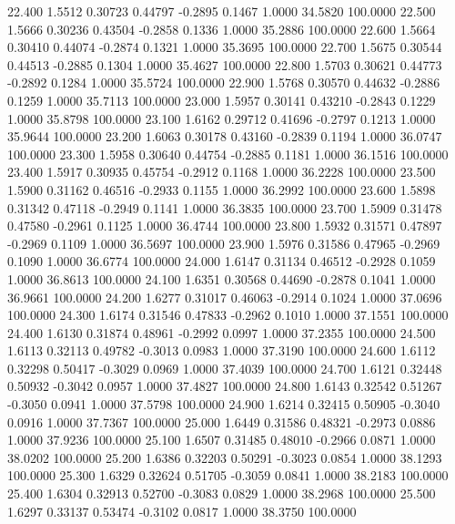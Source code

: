   22.400   1.5512   0.30723   0.44797  -0.2895   0.1467   1.0000  34.5820 100.0000
  22.500   1.5666   0.30236   0.43504  -0.2858   0.1336   1.0000  35.2886 100.0000
  22.600   1.5664   0.30410   0.44074  -0.2874   0.1321   1.0000  35.3695 100.0000
  22.700   1.5675   0.30544   0.44513  -0.2885   0.1304   1.0000  35.4627 100.0000
  22.800   1.5703   0.30621   0.44773  -0.2892   0.1284   1.0000  35.5724 100.0000
  22.900   1.5768   0.30570   0.44632  -0.2886   0.1259   1.0000  35.7113 100.0000
  23.000   1.5957   0.30141   0.43210  -0.2843   0.1229   1.0000  35.8798 100.0000
  23.100   1.6162   0.29712   0.41696  -0.2797   0.1213   1.0000  35.9644 100.0000
  23.200   1.6063   0.30178   0.43160  -0.2839   0.1194   1.0000  36.0747 100.0000
  23.300   1.5958   0.30640   0.44754  -0.2885   0.1181   1.0000  36.1516 100.0000
  23.400   1.5917   0.30935   0.45754  -0.2912   0.1168   1.0000  36.2228 100.0000
  23.500   1.5900   0.31162   0.46516  -0.2933   0.1155   1.0000  36.2992 100.0000
  23.600   1.5898   0.31342   0.47118  -0.2949   0.1141   1.0000  36.3835 100.0000
  23.700   1.5909   0.31478   0.47580  -0.2961   0.1125   1.0000  36.4744 100.0000
  23.800   1.5932   0.31571   0.47897  -0.2969   0.1109   1.0000  36.5697 100.0000
  23.900   1.5976   0.31586   0.47965  -0.2969   0.1090   1.0000  36.6774 100.0000
  24.000   1.6147   0.31134   0.46512  -0.2928   0.1059   1.0000  36.8613 100.0000
  24.100   1.6351   0.30568   0.44690  -0.2878   0.1041   1.0000  36.9661 100.0000
  24.200   1.6277   0.31017   0.46063  -0.2914   0.1024   1.0000  37.0696 100.0000
  24.300   1.6174   0.31546   0.47833  -0.2962   0.1010   1.0000  37.1551 100.0000
  24.400   1.6130   0.31874   0.48961  -0.2992   0.0997   1.0000  37.2355 100.0000
  24.500   1.6113   0.32113   0.49782  -0.3013   0.0983   1.0000  37.3190 100.0000
  24.600   1.6112   0.32298   0.50417  -0.3029   0.0969   1.0000  37.4039 100.0000
  24.700   1.6121   0.32448   0.50932  -0.3042   0.0957   1.0000  37.4827 100.0000
  24.800   1.6143   0.32542   0.51267  -0.3050   0.0941   1.0000  37.5798 100.0000
  24.900   1.6214   0.32415   0.50905  -0.3040   0.0916   1.0000  37.7367 100.0000
  25.000   1.6449   0.31586   0.48321  -0.2973   0.0886   1.0000  37.9236 100.0000
  25.100   1.6507   0.31485   0.48010  -0.2966   0.0871   1.0000  38.0202 100.0000
  25.200   1.6386   0.32203   0.50291  -0.3023   0.0854   1.0000  38.1293 100.0000
  25.300   1.6329   0.32624   0.51705  -0.3059   0.0841   1.0000  38.2183 100.0000
  25.400   1.6304   0.32913   0.52700  -0.3083   0.0829   1.0000  38.2968 100.0000
  25.500   1.6297   0.33137   0.53474  -0.3102   0.0817   1.0000  38.3750 100.0000
